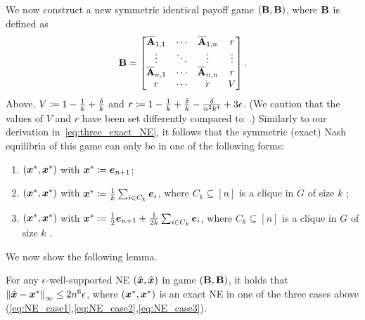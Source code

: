 We now construct a new symmetric identical payoff game $(\mathbf{B}, \mathbf{B})$, where $\mathbf{B}$ is defined as
    \begin{align}
        \mathbf{B} = \begin{bmatrix}
         \overline{\mathbf{A}}_{1, 1} & \cdots & \overline{\mathbf{A}}_{1, n}  & r\\
         \vdots & \ddots & \vdots & \vdots \\
         \overline{\mathbf{A}}_{n, 1} & \cdots & \overline{\mathbf{A}}_{n,n} & r\\
         r & \cdots & r  & V\\
    \end{bmatrix}. \label{eq:unique_NP_matrix}
    \end{align}
Above, $V \coloneqq 1 - \frac{1}{k} + \frac{\delta}{k}$ and $r \coloneqq 1 - \frac{1}{k} + \frac{\delta}{k} - \frac{\delta}{n^2k^4} + 3\epsilon$. (We caution that the values of $V$ and $r$ have been set differently compared to~.) Similarly to our derivation in~\cref{eq:three_exact_NE}, it follows that the symmetric (exact) Nash equilibria of this game can only be in one of the following forms:
\begin{enumerate}
        \item $({\bm{x}}^*, {\bm{x}}^*)$ with ${\bm{x}}^* \coloneqq {\bm{e}}_{n+ 1}$; \label{eq:NE_case1}
        \item $({\bm{x}}^*, {\bm{x}}^*)$ with ${\bm{x}}^* \coloneqq \frac{1}{k} \sum_{i \in C_k} {\bm{e}}_i$, where $C_k \subseteq [n]$ is a clique in $G$ of size $k$ \label{eq:NE_case2};
        \item $({\bm{x}}^*, {\bm{x}}^*)$ with ${\bm{x}}^* \coloneqq \frac{1}{2} {\bm{e}}_{n + 1} + \frac{1}{2k} \sum_{i \in C_k} {\bm{e}}_i$, where $C_k \subseteq [n]$ is a clique in $G$ of size $k$ \label{eq:NE_case3}.
\end{enumerate}

We now show the following lemma.

\begin{lemma} \label{lemma:NP_completeness_for_two_symmetric_well_supported}
    For any $\epsilon$-well-supported NE $(\hat{{\bm{x}}}, \hat{{\bm{x}}})$ in game $(\mathbf{B}, \mathbf{B})$, it holds that $\left\| \hat{{\bm{x}}} - {\bm{x}}^* \right\|_{\infty} \leq 2n^6\epsilon$, where $({\bm{x}}^*, {\bm{x}}^*)$ is an exact NE in one of the three cases above (\ref{eq:NE_case1},\ref{eq:NE_case2},\ref{eq:NE_case3}).
\end{lemma}

